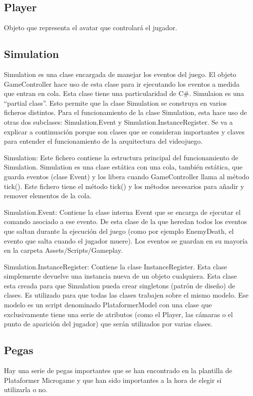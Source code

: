 \subsection{Player}
Objeto que representa el avatar que controlará el jugador.

\subsection{Simulation}
Simulation es una clase encargada de manejar los eventos del juego. El objeto GameController hace uso de esta clase para ir ejecutando los eventos a medida que entran en cola. Esta clase tiene una particularidad de C\#. Simulaion es una “partial class”. Esto permite que la clase Simulation se construya en varios ficheros distintos. Para el funcionamiento de la clase Simulation, esta hace uso de otras dos subclases: Simulation.Event y Simulation.InstanceRegister. Se va a explicar a continuación porque son clases que se consideran importantes y claves para entender el funcionamiento de la arquitectura del videojuego.

Simulation: Este fichero contiene la estructura principal del funcionamiento de Simulation. Simulation es una clase estática con una cola, también estática, que guarda eventos (clase Event) y los libera cuando GameController llama al método tick(). Este fichero tiene el método tick() y los métodos necesarios para añadir y remover elementos de la cola. 

Simulation.Event: Contiene la clase interna Event que se encarga de ejecutar el comando asociado a ese evento. De esta clase de la que heredan todos los eventos que saltan durante la ejecución del juego (como por ejemplo EnemyDeath, el evento que salta cuando el jugador muere). Los eventos se guardan en su mayoría en la carpeta Assets/Scripts/Gameplay.

Simulation.InstanceRegister: Contiene la clase InstanceRegister. Esta clase simplemente devuelve una instancia nueva de un objeto cualquiera. Esta clase esta creada para que Simulation pueda crear singletons (patrón de diseño) de clases. Es utilizado para que todas las clases trabajen sobre el mismo modelo. Ese modelo es un script denominado PlataformerModel con una clase que exclusivamente tiene una serie de atributos (como el Player, las cámaras o el punto de aparición del jugador) que serán utilizados por varias clases.

\subsection{Pegas}
Hay una serie de pegas importantes que se han encontrado en la plantilla de Plataformer Microgame y que han sido importantes a la hora de elegir si utilizarla o no.

